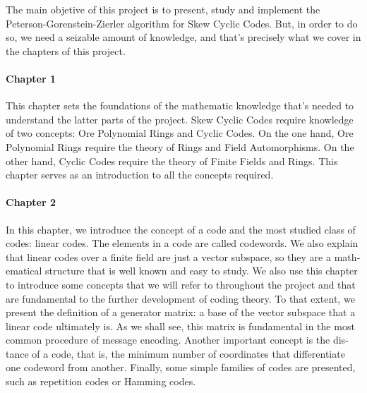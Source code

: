\begin{otherlanguage}{english}

The main objetive of this project is to present, study and implement the Peterson-Gorenstein-Zierler algorithm for Skew Cyclic Codes.
But, in order to do so, we need a seizable amount of knowledge, and that's precisely what we cover in the chapters of this project.

\paragraph{Chapter 1} This chapter sets the foundations of the mathematic knowledge that's needed to understand the latter parts of the project. 
Skew Cyclic Codes require knowledge of two concepts: Ore Polynomial Rings and Cyclic Codes. 
On the one hand, Ore Polynomial Rings require the theory of Rings and Field Automorphisms. 
On the other hand, Cyclic Codes require the theory of Finite Fields and Rings. 
This chapter serves as an introduction to all the concepts required.

\paragraph{Chapter 2} In this chapter, we introduce the concept of a code and the most studied class of codes: linear codes.
The elements in a code are called codewords.
We also explain that linear codes over a finite field are just a vector subspace, so they are a mathematical structure that is well known and easy to study.
We also use this chapter to introduce some concepts that we will refer to throughout the project and that are fundamental to the further development of coding theory.
To that extent, we present the definition of a generator matrix: a base of the vector subspace that a linear code ultimately is.
As we shall see, this matrix is fundamental in the most common procedure of message encoding.
Another important concept is the distance of a code, that is, the minimum number of coordinates that differentiate one codeword from another.
Finally, some simple families of codes are presented, such as repetition codes or Hamming codes.


\end{otherlanguage}
